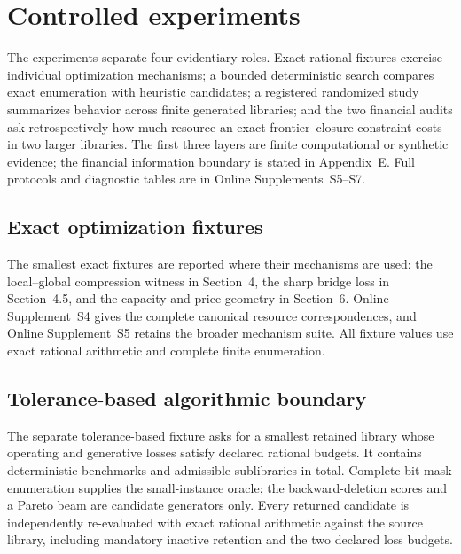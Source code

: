 \section{Controlled experiments}\label{sec:experiments}

The experiments separate four evidentiary roles. Exact rational fixtures
exercise individual optimization mechanisms; a bounded deterministic search
compares exact enumeration with heuristic candidates; a registered randomized
study summarizes behavior across finite generated libraries; and the two
financial audits ask retrospectively how much resource an exact
frontier--closure constraint costs in two larger libraries. The first three
layers are finite computational or synthetic evidence; the financial
information boundary is stated in Appendix~E. Full protocols and diagnostic
tables are in Online Supplements~S5--S7.

\subsection{Exact optimization fixtures}

The smallest exact fixtures are reported where their mechanisms are used:
the local--global compression witness in Section~4, the sharp bridge loss in
Section~4.5, and the capacity and price geometry in Section~6.  Online
Supplement~S4 gives the complete canonical resource correspondences, and
Online Supplement~S5 retains the broader mechanism suite.  All fixture values
use exact rational arithmetic and complete finite enumeration.

\subsection{Tolerance-based algorithmic boundary}
\label{subsec:aor-approximate-compression}



The separate tolerance-based fixture asks for a smallest retained library
whose operating and generative losses satisfy declared rational budgets. It
contains \AORApproximateBenchmarkCount{} deterministic benchmarks and
\AORApproximateSubsetCount{} admissible sublibraries in total. Complete
bit-mask enumeration supplies the small-instance oracle; the
\AORApproximateGreedyRuleCount{} backward-deletion scores and a Pareto beam are
candidate generators only. Every returned candidate is independently
re-evaluated with exact rational arithmetic against the source library,
including mandatory inactive retention and the two declared loss budgets.

